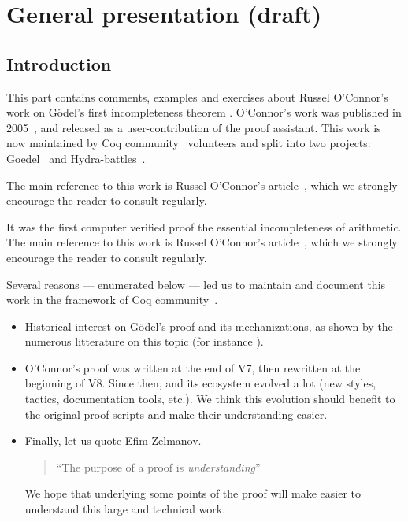 \chapter{General presentation (draft)}

\section{Introduction}
This part contains comments, examples  and exercises about Russel O'Connor's work on G\"{o}del's first incompleteness theorem  \cite{Godel1986-GDECW}.
O'Connor's work was published in 2005~\cite{OConnor05}, and released as a user-contribution of the \coq proof assistant.
This work is now maintained by Coq community~\cite{CoqCommunity} volunteers and split into two projects: Goedel~\cite{Goedel} and Hydra-battles~\cite{HydraBattles}.

The main reference to this work is  Russel O'Connor's article~\cite{OConnor05}, which we strongly encourage the reader to 
consult regularly. 

It was the first computer verified proof 
the essential incompleteness of arithmetic.
The main reference to this work is  Russel O'Connor's article~\cite{OConnor05}, which we strongly encourage the reader to 
consult regularly. 

Several reasons --- enumerated below --- led us to maintain and document this work in the framework of 
Coq community~\cite{CoqCommunity}.



 \begin{itemize}
 \item Historical interest on G\"{o}del's proof and its mechanizations, as shown by the numerous litterature on this topic
   (for instance \cite{smullyan1992godel, Hofstadter1999Godel, GoedelCassou}).
 
   
  \item O'Connor's proof was written at the end of \coq V7, then rewritten at the beginning of \coq V8. Since then, \coq and its ecosystem evolved a lot (new styles, tactics, documentation tools, etc.).
          We think this evolution should benefit
          to the original proof-scripts and make their understanding easier.

        \item Finally, let us quote  Efim Zelmanov.
             \begin{quote}
      ``The purpose of a proof is \emph{understanding}'' ~\cite{mathproof}
       
    \end{quote}
    We hope that underlying some points of the proof will
     make easier to understand this large and technical work.

        \end{itemize}

